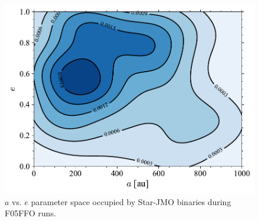 \documentclass[submission,phys]{lib/SciPost}
\begin{document}
   \begin{figure}
    \centering
        \includegraphics[width=\columnwidth]{figures/Fractal_rvir0.5_FF_Obs_sem_ecc_mixed_systs.pdf}
        \caption{$a$ vs. $e$ parameter space occupied by Star-JMO binaries during F05FFO runs.}
         \label{Fig:MixedSys_OrbParams}
   \end{figure}
\end{document}
